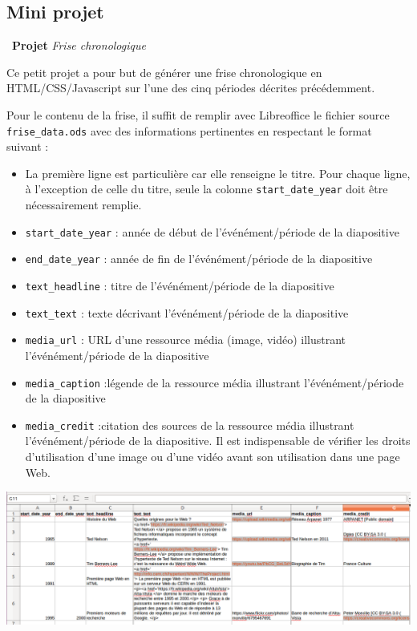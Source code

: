 \documentclass[a4paper, french, 11pt]{article}  %
\newcounter{proj}
\newenvironment{projet}[1]
{\par \medskip   \addtocounter{proj}{1} \noindent  
 \begin {bclogo}[noborder = true, barre=zigzag,logo=\bcloupe, marge=4] {~\textbf{Projet} \textbf{\theproj} {\itshape #1} }  \par}
{
\end{bclogo}
 \par \bigskip }
\begin{document}
\subsection{Mini projet}


\begin{projet}{Frise chronologique}

Ce petit projet a pour but  de générer une frise chronologique en HTML/CSS/Javascript sur l'une des cinq périodes décrites précédemment.   

Pour le contenu de la frise, il suffit de remplir avec Libreoffice le fichier source \texttt{frise\_data.ods}  avec des informations pertinentes en respectant le format suivant :

\begin{itemize}
\item  La première ligne est particulière car elle renseigne le titre. Pour chaque ligne, à l'exception de celle du titre, seule la colonne \texttt{start\_date\_year} doit être nécessairement remplie.
\item \texttt{start\_date\_year} : année de début de l'événément/période de la diapositive
\item \texttt{end\_date\_year} : année de fin de l'événément/période de la diapositive
\item \texttt{text\_headline} : titre de l'événément/période de la diapositive
\item \texttt{text\_text} : texte décrivant l'événément/période de la diapositive
\item \texttt{media\_url} : URL d'une ressource média (image, vidéo) illustrant l'événément/période de la diapositive
\item \texttt{media\_caption} :légende de la ressource média illustrant l'événément/période de la diapositive
\item \texttt{media\_credit} :citation des sources de la ressource média illustrant l'événément/période de la diapositive.
Il est indispensable de vérifier les droits d'utilisation d'une image ou d'une vidéo avant son utilisation dans une page Web.
\end{itemize}

\begin{center}
\includegraphics[scale=0.4]{images/frise_tableur.png}
\end{center}


\end{projet}
\end{document}
